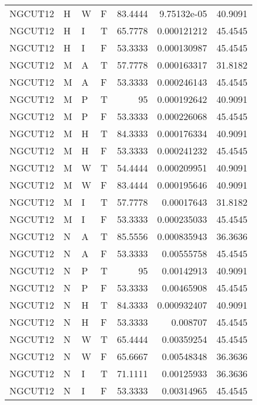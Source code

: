 \begin{table}[htb!]
{\begin{tabular}{llllrrr}
            NGCUT12  & H     & W     & F          & 83.4444    & 9.75132e-05 & 40.9091  \\
            NGCUT12  & H     & I     & T          & 65.7778    & 0.000121212 & 45.4545  \\
            NGCUT12  & H     & I     & F          & 53.3333    & 0.000130987 & 45.4545  \\
            NGCUT12  & M     & A     & T          & 57.7778    & 0.000163317 & 31.8182  \\
            NGCUT12  & M     & A     & F          & 53.3333    & 0.000246143 & 45.4545  \\
            NGCUT12  & M     & P     & T          & 95         & 0.000192642 & 40.9091  \\
            NGCUT12  & M     & P     & F          & 53.3333    & 0.000226068 & 45.4545  \\
            NGCUT12  & M     & H     & T          & 84.3333    & 0.000176334 & 40.9091  \\
            NGCUT12  & M     & H     & F          & 53.3333    & 0.000241232 & 45.4545  \\
            NGCUT12  & M     & W     & T          & 54.4444    & 0.000209951 & 40.9091  \\
            NGCUT12  & M     & W     & F          & 83.4444    & 0.000195646 & 40.9091  \\
            NGCUT12  & M     & I     & T          & 57.7778    & 0.00017643  & 31.8182  \\
            NGCUT12  & M     & I     & F          & 53.3333    & 0.000235033 & 45.4545  \\
            NGCUT12  & N     & A     & T          & 85.5556    & 0.000835943 & 36.3636  \\
            NGCUT12  & N     & A     & F          & 53.3333    & 0.00555758  & 45.4545  \\
            NGCUT12  & N     & P     & T          & 95         & 0.00142913  & 40.9091  \\
            NGCUT12  & N     & P     & F          & 53.3333    & 0.00465908  & 45.4545  \\
            NGCUT12  & N     & H     & T          & 84.3333    & 0.000932407 & 40.9091  \\
            NGCUT12  & N     & H     & F          & 53.3333    & 0.008707    & 45.4545  \\
            NGCUT12  & N     & W     & T          & 65.4444    & 0.00359254  & 45.4545  \\
            NGCUT12  & N     & W     & F          & 65.6667    & 0.00548348  & 36.3636  \\
            NGCUT12  & N     & I     & T          & 71.1111    & 0.00125933  & 36.3636  \\
            NGCUT12  & N     & I     & F          & 53.3333    & 0.00314965  & 45.4545  \\
            \hline
        \end{tabular}
    }{
    }
\end{table} 
